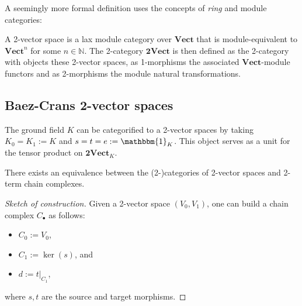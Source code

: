     A seemingly more formal definition uses the concepts of \textit{ring} and module categories:
    \begin{adefinition}
        A 2-vector space is a lax module category over $\mathbf{Vect}$ that is module-equivalent to $\mathbf{Vect}^n$ for some $n\in\mathbb{N}$. The 2-category $\mathbf{2Vect}$ is then defined as the 2-category with objects these 2-vector spaces, as 1-morphisms the associated $\mathbf{Vect}$-module functors and as 2-morphisms the module natural transformations.
    \end{adefinition}

\subsection{Baez-Crans 2-vector spaces}\label{section:baez_crans}


    \begin{example}
        The ground field $K$ can be categorified to a 2-vector spaces by taking $K_0=K_1:=K$ and $s=t=e:=\mathbbm{1}_K$. This object serves as a unit for the tensor product on $\mathbf{2Vect}_K$.
    \end{example}

    \begin{property}
        There exists an equivalence between the (2-)categories of 2-vector spaces and 2-term chain complexes.
        \begin{mdframed}[roundcorner=10pt, linecolor=blue, linewidth=1pt]
            \begin{proof}[Sketch of construction]
                Given a 2-vector space $(V_0,V_1)$, one can build a chain complex $C_\bullet$ as follows:
                \begin{itemize}
                    \item $C_0 := V_0$,
                    \item $C_1 := \ker(s)$, and
                    \item $d := t|_{C_1}$,
                \end{itemize}
                where $s,t$ are the source and target morphisms.
            \end{proof}
        \end{mdframed}
    \end{property}

